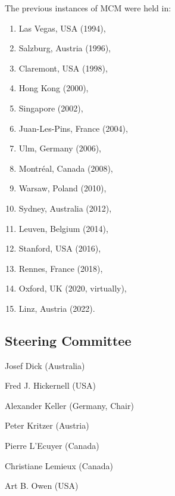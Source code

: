 The previous instances of MCM were held in:
\begin{enumerate}
\item Las Vegas, USA (1994),
\item Salzburg, Austria (1996),
\item Claremont, USA (1998),
\item Hong Kong (2000),
\item Singapore (2002),
\item Juan-Les-Pins, France (2004),
\item Ulm, Germany (2006),
\item Montr\'{e}al, Canada (2008),
\item Warsaw, Poland (2010),
\item Sydney, Australia (2012),
\item Leuven, Belgium (2014),
\item Stanford, USA (2016),
\item Rennes, France (2018),
\item Oxford, UK (2020, virtually),
\item Linz, Austria (2022).
\end{enumerate}

\newpage
\subsection{Steering Committee}

\setlength{\columnsep}{1cm}
\begin{multicols}{2}
\raggedright

Josef Dick (Australia)

Fred J. Hickernell (USA)

Alexander Keller (Germany, Chair)

Peter Kritzer (Austria)

Pierre L'Ecuyer (Canada)

Christiane Lemieux (Canada)

Art B. Owen (USA)


\end{multicols}

